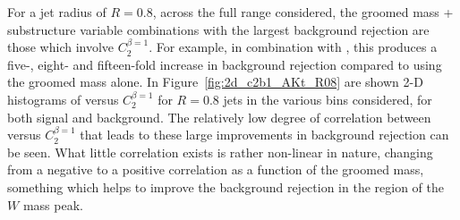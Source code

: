 For a jet radius of $R=0.8$, across the full \pt range considered, the
groomed mass + substructure variable combinations with the
largest background rejection are those which
involve $C_2^{\beta=1}$. For example, in combination with
\msd, this produces a five-, eight- and fifteen-fold
increase in background rejection compared to using the groomed mass
alone. In Figure~\ref{fig:2d_c2b1_AKt_R08} are shown 2-D histograms of
\msd versus $C_2^{\beta=1}$ for $R=0.8$ jets in the various \pt bins
considered, for both signal and background. The relatively low degree of
correlation between \msd versus $C_2^{\beta=1}$ that
leads to these large improvements in background rejection can be
seen. What little correlation exists is rather
non-linear in nature, changing from a negative to a positive
correlation as a function of the groomed mass, something which helps
to improve the background rejection in the region of the $W$ mass peak.

